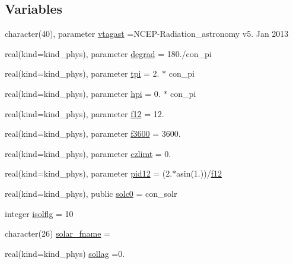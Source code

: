 \subsection*{Variables}
\begin{DoxyCompactItemize}
\item 
character(40), parameter \hyperlink{namespacemodule__radiation__astronomy_aa3497dc9fa4bbd8248fdf0f2784c268a}{vtagast} =\textquotesingle{}N\+C\+EP-\/Radiation\+\_\+astronomy v5. Jan 2013 \textquotesingle{}
\item 
real(kind=kind\+\_\+phys), parameter \hyperlink{group__module__radiation__astronomy_ga220d2b997b3073cf2985d62111c5405d}{degrad} = 180./con\+\_\+pi
\item 
real(kind=kind\+\_\+phys), parameter \hyperlink{group__module__radiation__astronomy_ga4fbf4be04e17f1f8d0674ee2e20506b0}{tpi} = 2. $\ast$ con\+\_\+pi
\item 
real(kind=kind\+\_\+phys), parameter \hyperlink{group__module__radiation__astronomy_ga7369d8561566f5e7e51ccc40e09f2520}{hpi} = 0. $\ast$ con\+\_\+pi
\item 
real(kind=kind\+\_\+phys), parameter \hyperlink{group__module__radiation__astronomy_gad59856e8f877eb05a6b22610f14a391d}{f12} = 12.
\item 
real(kind=kind\+\_\+phys), parameter \hyperlink{group__module__radiation__astronomy_ga37b491dde50d06e339effb4a31d9f245}{f3600} = 3600.
\item 
real(kind=kind\+\_\+phys), parameter \hyperlink{group__module__radiation__astronomy_gafeb2fccbe8137de6099a09035762ff5e}{czlimt} = 0.
\item 
real(kind=kind\+\_\+phys), parameter \hyperlink{group__module__radiation__astronomy_gadbf9cdfc7b55d882f015a4bc4ef276ab}{pid12} = (2.$\ast$asin(1.))/\hyperlink{group__module__radiation__astronomy_gad59856e8f877eb05a6b22610f14a391d}{f12}
\item 
real(kind=kind\+\_\+phys), public \hyperlink{group__module__radiation__astronomy_ga37e08872f67023b11f839ac15151af09}{solc0} = con\+\_\+solr
\item 
integer \hyperlink{group__module__radiation__astronomy_ga7ea431b6d4f4d6ee1f6545d6baeee44f}{isolflg} = 10
\item 
character(26) \hyperlink{group__module__radiation__astronomy_ga05ee7e378d38b90242738b9bf6c40c00}{solar\+\_\+fname} = \textquotesingle{} \textquotesingle{}
\item 
real(kind=kind\+\_\+phys) \hyperlink{group__module__radiation__astronomy_ga264a011aa71fb670339ac555dc24e486}{sollag} =0.

\end{DoxyCompactItemize}
